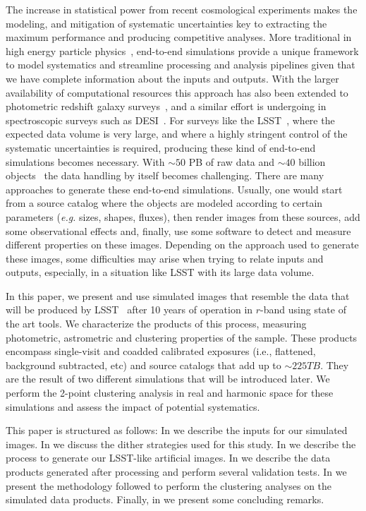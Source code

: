 \documentclass[\docopts]{\docclass}
\begin{document}
The increase in statistical power from recent cosmological experiments makes the modeling, and mitigation of systematic uncertainties key to extracting the maximum performance and producing competitive analyses. More traditional in high energy particle physics~\citep{Brun:118715, 2006JHEP...05..026S}, end-to-end simulations provide a unique framework to
model systematics and streamline processing and analysis pipelines given that we have complete information about the inputs and outputs. With the larger availability of computational resources this approach has also been extended to photometric redshift galaxy surveys~\citep{2016MNRAS.457..786S,2016ApJ...817...25B}, and a similar effort is undergoing in spectroscopic surveys such as DESI~\citep{2016arXiv161100036D}. For surveys like the LSST~\citep{2008arXiv0805.2366I}, where the expected data volume is very large, and where a highly stringent control of the systematic uncertainties is required, producing these
kind of end-to-end simulations becomes necessary. With $\sim 50$ PB of raw data and $\sim 40$ billion objects~\citep{2008arXiv0805.2366I} the data handling by itself becomes challenging. There are many approaches to generate these end-to-end simulations. Usually, one would start from a source catalog where the objects are modeled according to certain parameters (\textit{e.g.} sizes, shapes, fluxes), then render images from these sources, add some observational effects and, finally, use some software to detect and measure different properties on these images. Depending on the approach used to generate these images, some difficulties may arise when trying to relate inputs and outputs, especially, in a situation like LSST with its large data volume. 

In this paper, we present and use simulated images that resemble the data that will be produced by
LSST~\citep{2008arXiv0805.2366I} after 10 years of operation in $r$-band using state of the art tools. We characterize the products of this process, measuring photometric, astrometric and clustering properties of the sample. These products encompass single-visit and coadded calibrated exposures (i.e., flattened, background subtracted, etc) and source catalogs that add up to $\sim 225 TB$. They are the result of two different simulations that will be introduced later. We perform the 2-point clustering analysis in real and harmonic space for these simulations and assess the impact of potential systematics.

This paper is structured as follows: In  we describe the inputs for our simulated images. In  we discuss the dither strategies used for this study. In  we describe the process to generate our LSST-like artificial images. In  we describe the data products generated after processing and perform several validation tests. In  we present the methodology followed to perform the clustering analyses on the simulated data products. Finally, in  we present some concluding remarks.
\end{document}
